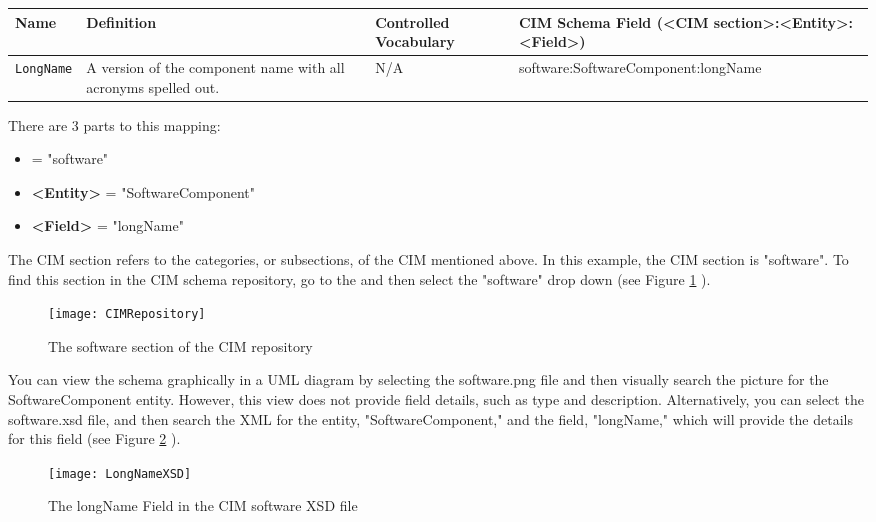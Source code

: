 \begin{tabular}{|p{7cm}|p{5cm}|p{15mm}|p{15mm}|}
     \hline\hline
     {\bf Name} & {\bf Definition} & {\bf Controlled Vocabulary} & {\bf CIM Schema Field \linebreak (<CIM section>:<Entity>:<Field>)}\\
     \hline\hline
     {\tt LongName} & A version of the component name with all acronyms spelled out. & N/A & software:SoftwareComponent:longName \\
     \hline\hline
\end{tabular}
\linebreak

There are 3 parts to this mapping:

\begin{itemize}
  \item {\bf <CIM section>} = "software"
  \item {\bf <Entity>} = "SoftwareComponent"
  \item {\bf <Field>} = "longName"
\end{itemize}

The CIM section refers to the categories, or subsections, of the CIM
mentioned above.  In this example, the CIM section is "software".  To find
this section in the CIM schema repository, go to the
and then select the "software" drop down (see Figure \ref{fig:CIMRepository} ).

\begin{figure}[h]
\centering
\texttt{[image: CIMRepository]}
\caption{The software section of the CIM repository}
\label{fig:CIMRepository}
\end{figure}
\clearpage

You can view the schema graphically in a UML diagram by selecting the
software.png file and then visually search the picture for the
SoftwareComponent entity.
However, this view does not provide field details, such as type and
description.  Alternatively, you can select the software.xsd file, and
then search the XML for the entity, "SoftwareComponent," and the field,
"longName," which will provide the details for this field (see Figure \ref{fig:LongNameXSD} ).

\begin{figure}[h]
\centering
\texttt{[image: LongNameXSD]}
\caption{The longName Field in the CIM software XSD file}
\label{fig:LongNameXSD}
\end{figure}
\clearpage

